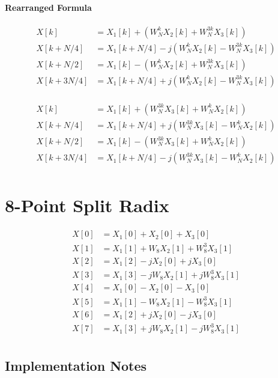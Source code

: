 \documentclass[11pt]{article}
\begin{document}
\paragraph{Rearranged Formula}

\[\begin{split}
  X[k] & = X_1[k] + \left(W_N^k X_2[k] + W_N^{3k} X_3[k]\right)\\
  X[k + N/4] & = X_1[k + N/4] - j\left(W_N^k X_2[k] - W_N^{3k} X_3[k]\right) \\
  X[k + N/2] & = X_1[k] - \left(W_N^k X_2[k] + W_N^{3k} X_3[k]\right) \\
  X[k + 3N/4] & = X_1[k + N/4] + j\left(W_N^k X_2[k] - W_N^{3k} X_3[k]\right) \\
\end{split}\]

\[\begin{split}
  X[k] & = X_1[k] + \left(W_N^{3k} X_3[k] + W_N^k X_2[k]\right)\\
  X[k + N/4] & = X_1[k + N/4] + j\left(W_N^{3k} X_3[k] - W_N^k X_2[k]\right) \\
  X[k + N/2] & = X_1[k] - \left(W_N^{3k} X_3[k] + W_N^k X_2[k]\right) \\
  X[k + 3N/4] & = X_1[k + N/4] - j\left(W_N^{3k} X_3[k] - W_N^k X_2[k]\right) \\
\end{split}\]

\section{8-Point Split Radix}

\[\begin{split}
  X[0] & = X_1[0] + X_2[0] + X_3[0]\\
  X[1] & = X_1[1] + W_8 X_2[1] + W_8^3 X_3[1]\\
  X[2] & = X_1[2] - jX_2[0] + j X_3[0]\\
  X[3] & = X_1[3] - jW_8 X_2[1] + jW_8^3 X_3[1]\\
  X[4] & = X_1[0] - X_2[0] - X_3[0]\\
  X[5] & = X_1[1] - W_8 X_2[1] - W_8^3 X_3[1]\\
  X[6] & = X_1[2] + jX_2[0] - jX_3[0]\\
  X[7] & = X_1[3] + jW_8 X_2[1] - jW_8^3 X_3[1]\\
\end{split}\]

\newpage

\subsection{Implementation Notes}\indent
\end{document}

